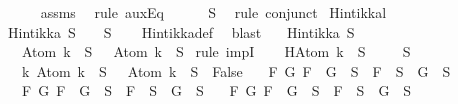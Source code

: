 \begin{isabellebody}
\ \ \ \ \isamarkupfalse%
\ assms\ \isamarkupfalse%
\ {\isacharparenleft}rule\ auxEq{\isacharparenright}\isanewline
\ \ \isamarkupfalse%
\ {\isachardoublequoteopen}{\isasymbottom}\ {\isasymnotin}\ S{\isachardoublequoteclose}\ \isamarkupfalse%
\ {\isacharparenleft}rule\ conjunct{}{\isacharparenright}\isanewline
{}\isamarkupfalse%
%
\endisatagproof
{\isafoldproof}%
%
\isadelimproof
\isanewline
%
\endisadelimproof
\isanewline
{}\isamarkupfalse%
\ Hintikka{\isacharunderscore}l{}{\isacharcolon}\ \isanewline
\ {\isachardoublequoteopen}Hintikka\ S\ {\isasymLongrightarrow}\ {\isasymbottom}\ {\isasymnotin}\ S{\isachardoublequoteclose}\isanewline
%
\isadelimproof
\ \ %
\endisadelimproof
%
\isatagproof
{}\isamarkupfalse%
\ Hintikka{\isacharunderscore}def\ \isamarkupfalse%
\ blast%
\endisatagproof
{\isafoldproof}%
%
\isadelimproof
\isanewline
%
\endisadelimproof
\isanewline
{}\isamarkupfalse%
\isanewline
\ \ \ {\isachardoublequoteopen}Hintikka\ S{\isachardoublequoteclose}\ \isanewline
\ \ \ {\isachardoublequoteopen}Atom\ k\ {\isasymin}\ S\ {\isasymlongrightarrow}\ \isactrlbold {\isasymnot}\ {\isacharparenleft}Atom\ k{\isacharparenright}\ {\isasymnotin}\ S{\isachardoublequoteclose}\isanewline
%
\isadelimproof
%
\endisadelimproof
%
\isatagproof
{}\isamarkupfalse%
\ {\isacharparenleft}rule\ impI{\isacharparenright}\isanewline
\ \ \isamarkupfalse%
\ H{\isacharcolon}{\isachardoublequoteopen}Atom\ k\ {\isasymin}\ S{\isachardoublequoteclose}\isanewline
\ \isamarkupfalse%
\ {\isachardoublequoteopen}{\isasymbottom}\ {\isasymnotin}\ S\isanewline
\ \ {\isasymand}\ {\isacharparenleft}{\isasymforall}k{\isachardot}\ Atom\ k\ {\isasymin}\ S\ {\isasymlongrightarrow}\ \isactrlbold {\isasymnot}\ {\isacharparenleft}Atom\ k{\isacharparenright}\ {\isasymin}\ S\ {\isasymlongrightarrow}\ False{\isacharparenright}\isanewline
\ \ {\isasymand}\ {\isacharparenleft}{\isasymforall}F\ G{\isachardot}\ F\ \isactrlbold {\isasymand}\ G\ {\isasymin}\ S\ {\isasymlongrightarrow}\ F\ {\isasymin}\ S\ {\isasymand}\ G\ {\isasymin}\ S{\isacharparenright}\isanewline
\ \ {\isasymand}\ {\isacharparenleft}{\isasymforall}F\ G{\isachardot}\ F\ \isactrlbold {\isasymor}\ G\ {\isasymin}\ S\ {\isasymlongrightarrow}\ F\ {\isasymin}\ S\ {\isasymor}\ G\ {\isasymin}\ S{\isacharparenright}\isanewline
\ \ {\isasymand}\ {\isacharparenleft}{\isasymforall}F\ G{\isachardot}\ F\ \isactrlbold {\isasymrightarrow}\ G\ {\isasymin}\ S\ {\isasymlongrightarrow}\ \isactrlbold {\isasymnot}F\ {\isasymin}\ S\ {\isasymor}\ G\ {\isasymin}\ S{\isacharparenright}\isanewline

\end{isabellebody}
